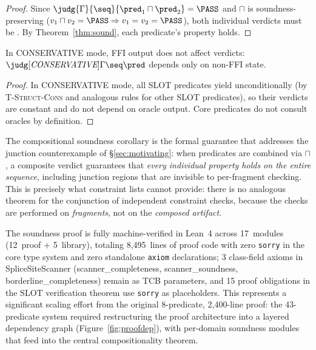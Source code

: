 \begin{proof}
Since $\judg{\Gamma}{\seq}{\pred_1 \sqcap \pred_2} = \PASS$ and
$\sqcap$ is soundness-preserving ($v_1 \sqcap v_2 = \PASS \Rightarrow
v_1 = v_2 = \PASS$), both individual verdicts must be \PASS.
By Theorem~\ref{thm:sound}, each predicate's property holds.
\end{proof}

\begin{corollary}\label{cor:slot}
In CONSERVATIVE mode, FFI output does not affect verdicts:
$\judg[\textit{CONSERVATIVE}]{\Gamma}{\seq}{\pred}$ depends only on
non-FFI state.
\end{corollary}

\begin{proof}
In CONSERVATIVE mode, all SLOT predicates yield \UNCERTAIN{}
unconditionally (by \textsc{T-Struct-Cons} and analogous rules for
other SLOT predicates), so their verdicts are constant and do not
depend on oracle output.
Core predicates do not consult oracles by definition.
\end{proof}

\noindent The compositional soundness corollary is the formal
guarantee that addresses the junction counterexample of
\S\ref{sec:motivating}: when predicates are combined via $\sqcap$,
a composite \PASS{} verdict guarantees that \emph{every individual
property holds on the entire sequence}, including junction regions
that are invisible to per-fragment checking.
This is precisely what constraint lists cannot provide: there is no
analogous theorem for the conjunction of independent constraint checks,
because the checks are performed on \emph{fragments}, not on the
\emph{composed artifact}.

The soundness proof is fully machine-verified in Lean~4 across
17~modules (12~proof $+$ 5~library), totaling 8,495~lines of proof
code with zero \texttt{sorry} in the core type system and zero standalone
\texttt{axiom} declarations; 3 class-field axioms in SpliceSiteScanner
(scanner\_completeness, scanner\_soundness, borderline\_completeness)
remain as TCB parameters, and 15 proof obligations in the SLOT verification
theorem use \texttt{sorry} as placeholders.
This represents a significant scaling effort from the original 8-predicate,
2,400-line proof: the 43-predicate system required restructuring the
proof architecture into a layered dependency graph
(Figure~\ref{fig:proofdep}), with per-domain soundness modules that
feed into the central compositionality theorem.

